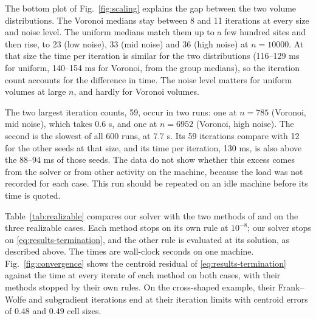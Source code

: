 \documentclass[main.tex]{subfiles}
\begin{document}
The bottom plot of Fig.~\ref{fig:scaling} explains the gap between the two volume distributions. The Voronoi medians stay between 8 and 11 iterations at every size and noise level. The uniform medians match them up to a few hundred sites and then rise, to 23 (low noise), 33 (mid noise) and 36 (high noise) at $n = 10000$. At that size the time per iteration is similar for the two distributions (116--129 ms for uniform, 140--154 ms for Voronoi, from the group medians), so the iteration count accounts for the difference in time. The noise level matters for uniform volumes at large $n$, and hardly for Voronoi volumes.

The two largest iteration counts, 59, occur in two runs: one at $n = 785$ (Voronoi, mid noise), which takes 0.6 s, and one at $n = 6952$ (Voronoi, high noise). The second is the slowest of all 600 runs, at 7.7 s. Its 59 iterations compare with 12 for the other seeds at that size, and its time per iteration, 130 ms, is also above the 88--94 ms of those seeds. The data do not show whether this excess comes from the solver or from other activity on the machine, because the load was not recorded for each case. This run should be repeated on an idle machine before its time is quoted.


Table~\ref{tab:realizable} compares our solver with the two methods of \citet{Bourne2025Inverting} and \citet{Bourne2026ConvexOrder} on the three realizable cases. Each method stops on its own rule at $10^{-8}$; our solver stops on \eqref{eq:results-termination}, and the other rule is evaluated at its solution, as described above. The times are wall-clock seconds on one machine.
Fig.~\ref{fig:convergence} shows the centroid residual of \eqref{eq:results-termination} against the time at every iterate of each method on both cases, with their methods stopped by their own rules.
On the cross-shaped example, their Frank--Wolfe and subgradient iterations end at their iteration limits with centroid errors of $0.48$ and $0.49$ cell sizes.
\end{document}
